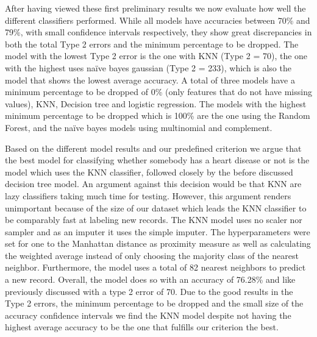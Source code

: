 After having viewed these first preliminary results we now evaluate how well the different classifiers performed. While all models have accuracies between 70\% and 79\%, with small confidence intervals respectively, they show great discrepancies in both the total Type 2 errors and the minimum percentage to be dropped. The model with the lowest Type 2 error is the one with KNN (Type 2 = 70), the one with the highest uses naïve bayes gaussian (Type 2 = 233), which is also the model that shows the lowest average accuracy. A total of three models have a minimum percentage to be dropped of 0\% (only features that do not have missing values), KNN, Decision tree and logistic regression. The models with the highest minimum percentage to be dropped which is 100\% are the one using the Random Forest, and the naïve bayes models using multinomial and complement. 

Based on the different model results and our predefined criterion we argue that the best model for classifying whether somebody has a heart disease or not is the model which uses the KNN classifier, followed closely by the before discussed decision tree model. An argument against this decision would be that KNN are lazy classifiers taking much time for testing. However, this argument renders unimportant because of the size of our dataset which leads the KNN classifier to be comparably fast at labeling new records. The KNN model uses no scaler nor sampler and as an imputer it uses the simple imputer. The hyperparameters were set for one to the Manhattan distance as proximity measure as well as calculating the weighted average instead of only choosing the majority class of the nearest neighbor. Furthermore, the model uses a total of 82 nearest neighbors to predict a new record. Overall, the model does so with an accuracy of 76.28\% and like previously discussed with a type 2 error of 70. Due to the good results in the Type 2 errors, the minimum percentage to be dropped and the small size of the accuracy confidence intervals we find the KNN model despite not having the highest average accuracy to be the one that fulfills our criterion the best. 